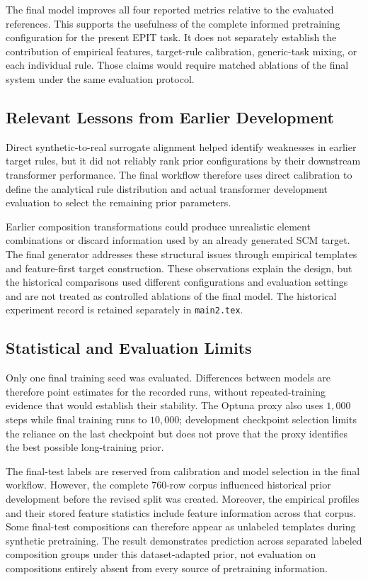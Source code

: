 \documentclass{article}
\begin{document}
The final model improves all four reported metrics relative to the evaluated
references. This supports the usefulness of the complete informed
pretraining configuration for the present EPIT task. It does not separately
establish the contribution of empirical features, target-rule calibration,
generic-task mixing, or each individual rule. Those claims would require
matched ablations of the final system under the same evaluation protocol.

\subsection{Relevant Lessons from Earlier Development}

Direct synthetic-to-real surrogate alignment helped identify weaknesses in
earlier target rules, but it did not reliably rank prior configurations by
their downstream transformer performance. The final workflow therefore uses
direct calibration to define the analytical rule distribution and actual
transformer development evaluation to select the remaining prior parameters.

Earlier composition transformations could produce unrealistic element
combinations or discard information used by an already generated SCM target.
The final generator addresses these structural issues through empirical
templates and feature-first target construction. These observations explain
the design, but the historical comparisons used different configurations and
evaluation settings and are not treated as controlled ablations of the final
model. The historical experiment record is retained separately in
\texttt{main2.tex}.

\subsection{Statistical and Evaluation Limits}

Only one final training seed was evaluated. Differences between models are
therefore point estimates for the recorded runs, without repeated-training
evidence that would establish their stability. The Optuna proxy also uses
\(1{,}000\) steps while final training runs to \(10{,}000\); development
checkpoint selection limits the reliance on the last checkpoint but does not
prove that the proxy identifies the best possible long-training prior.

The final-test labels are reserved from calibration and model selection in
the final workflow. However, the complete \(760\)-row corpus influenced
historical prior development before the revised split was created. Moreover,
the empirical profiles and their stored feature statistics include feature
information across that corpus. Some final-test compositions can therefore
appear as unlabeled templates during synthetic pretraining. The result
demonstrates prediction across separated labeled composition groups under
this dataset-adapted prior, not evaluation on compositions entirely absent
from every source of pretraining information.
\end{document}
